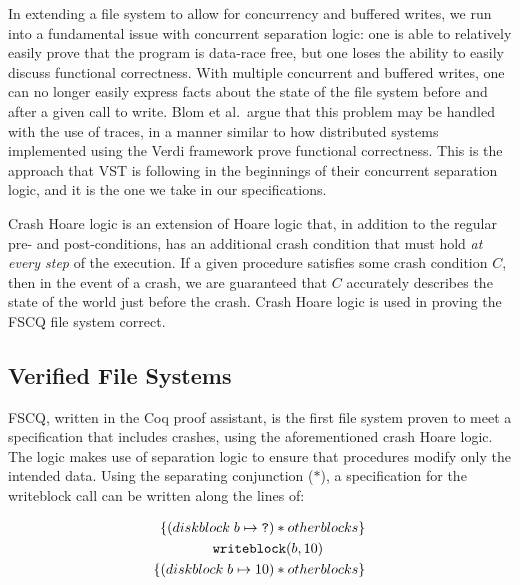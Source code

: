 In extending a file system to allow for concurrency and buffered writes, we run
into a fundamental issue with concurrent separation logic: one is able to
relatively easily prove that the program is data-race free, but one loses the
ability to easily discuss functional correctness. With multiple concurrent and
buffered writes, one can no longer easily express facts about the state of the
file system before and after a given call to write. Blom et al.\ argue that
this problem may be handled with the use of traces\cite{blom2015history}, in a
manner similar to how distributed systems implemented using the Verdi framework
prove functional correctness.\cite{wilcox2015verdi} This is the approach that
VST is following in the beginnings of their concurrent separation logic, and it
is the one we take in our specifications.


Crash Hoare logic\cite{chen2015using} is an extension of Hoare logic that, in
addition to the regular pre- and post-conditions, has an additional crash
condition that must hold \textit{at every step} of the execution. If a given
procedure satisfies some crash condition $C$, then in the event of a crash, we
are guaranteed that $C$ accurately describes the state of the world just before
the crash. Crash Hoare logic is used in proving the FSCQ\cite{chen2015using}
file system correct.

\subsection{Verified File Systems}
FSCQ\cite{chen2015using}, written in the Coq proof assistant, is the first file
system proven to meet a specification that includes crashes, using the
aforementioned crash Hoare logic. The logic makes use of separation logic to
ensure that procedures modify only the intended data. Using the separating
conjunction ($\ast$), a specification for the writeblock call can be written
along the lines of:

\begin{align*}
    \left\{ (diskblock\;b \mapsto \texttt{?}) \ast otherblocks \right\} \\ 
    \texttt{writeblock}(b, 10)\hspace{30px} \\
    \left\{ (diskblock\;b \mapsto 10) \ast otherblocks \right\}
\end{align*}

